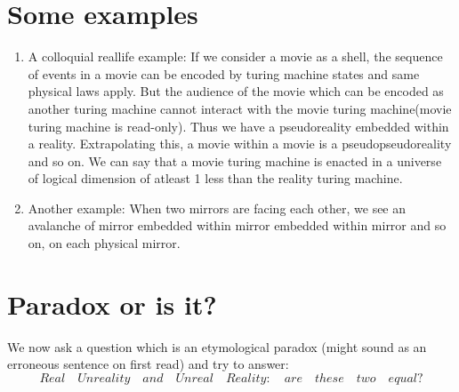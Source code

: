 \documentclass[11pt,onecolumn]{article}
\begin{document}
\section{Some examples}
\begin{enumerate}
\item A colloquial reallife example: If we consider a movie as a shell, the sequence of events in a movie can be encoded by  turing machine states and same physical laws apply. But the audience of the movie which can be encoded as another turing machine cannot interact with the movie turing machine(movie turing machine is read-only). Thus we have a pseudoreality embedded within a reality. Extrapolating this, a movie within a movie is a pseudopseudoreality and so on. We can say that a movie turing machine is enacted in a universe of logical dimension of atleast 1 less than the reality turing machine. 

\item Another example: When two mirrors are facing each other, we see an avalanche of mirror embedded  within mirror embedded within mirror and so on, on each physical mirror.
\end{enumerate}



\section{Paradox or is it?}

We now ask a question which is an etymological paradox (might sound as an erroneous sentence on first read) and try to answer:
\begin{equation}
Real \quad Unreality \quad and \quad Unreal \quad Reality: \quad are \quad these \quad two \quad equal?
\end{equation}
\end{document}
